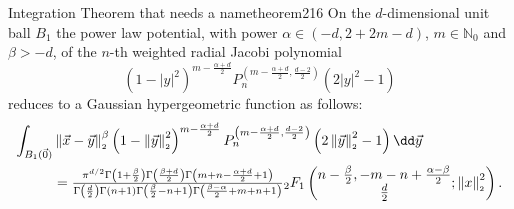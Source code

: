 \begin{theorem}{Integration Theorem that needs a name}{theorem216}
  On the $d$-dimensional unit ball $B_1$ the power law potential, with power $\alpha \in(-d,2+2m-d)$, $m\in\mathbb{N}_0$ and $\beta>-d$, of the $n$-th weighted radial Jacobi polynomial $$(1-|y|^2)^{m-\frac{\alpha+d}{2}}P_n^{\left(m-\frac{\alpha+d}{2},\frac{d-2}{2}\right)}(2|y|^2-1)$$ reduces to a Gaussian hypergeometric function as follows:
  \begin{align*}
    \int_{B_1(\vec{0})} & \norm{\vec{x}-\vec{y}}^\beta \left(1-\norm{\vec{y}}^2\right)^{m-\frac{\alpha+d}{2}} P_{n}^{\left(m-\frac{\alpha+d}{2},\frac{d-2}{2}\right)}\left(\jacobiarg{y}\right) \dd\vec{y}                                                                                                                                                                                                                           \\
                        & = \tfrac{\pi ^{d/2} \Gamma \left(1+\frac{\beta}{2}\right) \Gamma \left(\frac{\beta+d}{2}\right) \Gamma \left(m+n-\frac{\alpha+d}{2}+1\right)}{\Gamma \left(\frac{d}{2}\right) \Gamma (n+1) \Gamma \left(\frac{\beta}{2}-n+1\right) \Gamma \left(\frac{\beta-\alpha}{2}+m+n+1\right)}{}_2F_1\left(\begin{matrix}n-\frac{\beta}{2}, -m-n+\frac{\alpha-\beta}{2} \\\frac{d}{2}\end{matrix};\norm{x}^2\right).
  \end{align*}
\end{theorem}

